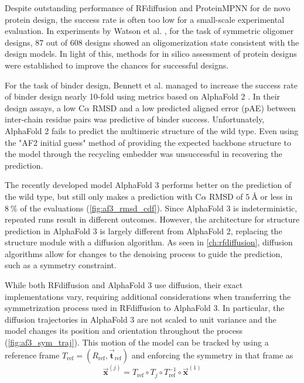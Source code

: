 Despite outstanding performance of RFdiffusion and ProteinMPNN for de novo protein design, the success rate is often too low for a small-scale experimental evaluation. In experiments by Watson et al. \cite{RFdiffusion}, for the task of symmetric oligomer designs, 87 out of 608 designs showed an oligomerization state consistent with the design models. In light of this, methods for in silico assessment of protein designs were established to improve the chances for successful designs. 

For the task of binder design, Bennett et al. managed to increase the success rate of binder design nearly 10-fold using metrics based on AlphaFold 2 \cite{binder_design}. In their design assays, a low C$\alpha$ RMSD and a low predicted aligned error (pAE) between inter-chain residue pairs was predictive of binder success. Unfortunately, AlphaFold 2 fails to predict the multimeric structure of the wild type. Even using the "AF2 initial guess" method \cite{binder_design} of providing the expected backbone structure to the model through the recycling embedder was unsuccessful in recovering the prediction. 

The recently developed model AlphaFold 3 \cite{af3} performs better on the prediction of the wild type, but still only makes a prediction with C$\alpha$ RMSD of $\SI{5}{\angstrom}$ or less in $\SI{8}{\percent}$ of the evaluations (\autoref{fig:af3_rmsd_cdf}). Since AlphaFold 3 is indeterministic, repeated runs  result in different outcomes. However, the architecture for structure prediction in AlphaFold 3 is largely different from AlphaFold 2, replacing the structure module with a diffusion algorithm. As seen in \autoref{ch:rfdiffusion}, diffusion algorithms allow for changes to the denoising process to guide the prediction, such as a symmetry constraint. 

While both RFdiffusion and AlphaFold 3 use diffusion, their exact implementations vary, requiring additional considerations when transferring the symmetrization process used in RFdiffusion to AlphaFold 3. In particular, the diffusion trajectories in AlphaFold 3 are not scaled to unit variance and the model changes its position and orientation throughout the process (\autoref{fig:af3_sym_traj}). This motion of the model can be tracked by using a reference frame $T_{\text{ref}} = (R_{\text{ref}}, \vec{\mathbf{t}}_{\text{ref}})$ and enforcing the symmetry in that frame as 
\begin{equation}
\vec{\mathbf{x}}^{(j)} = T_{\text{ref}} \circ T_j \circ T_{\text{ref}}^{-1} \circ \vec{\mathbf{x}}^{(1)}
\end{equation}

